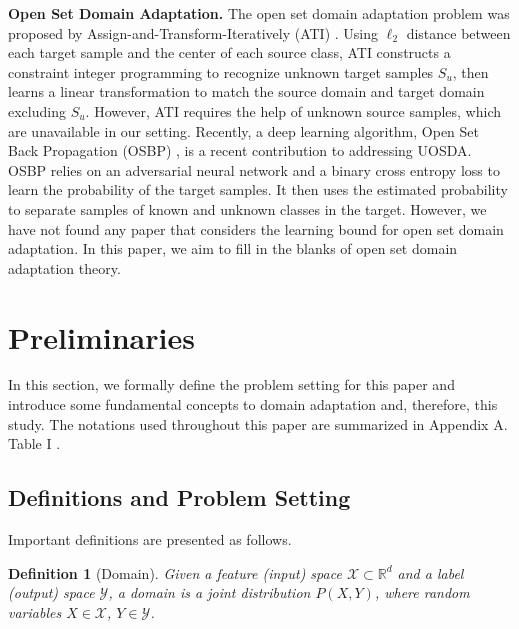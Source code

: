 \documentclass[journal]{IEEEtran}
\newtheorem{Definition}{Definition}
\begin{document}
\textbf{Open Set Domain Adaptation.} The open set domain adaptation problem was proposed by Assign-and-Transform-Iteratively (ATI) \cite{DBLP:conf/iccv/BustoG17}. Using $\ell_2$ distance between each target sample and the center of each source class, ATI constructs a constraint integer programming to recognize unknown target samples $S_u$, then learns a linear transformation to match the source domain and  target domain excluding $S_u$. However, ATI requires the help of unknown source samples, which are unavailable in our setting. Recently, a deep learning algorithm, Open Set Back Propagation (OSBP) \cite{DBLP:conf/eccv/SaitoYUH18}, is a recent contribution to addressing UOSDA. OSBP relies on an adversarial neural network and a binary cross entropy loss to learn the probability of the target samples. It then uses the estimated probability to separate samples of known and unknown classes in the target. However, we have not found any paper that considers the learning bound for open set domain adaptation. In this paper, we aim to fill in the blanks of open set domain adaptation theory.
 \section{ {Preliminaries}}
In this section, we formally define the problem setting for this paper and introduce some fundamental concepts to domain adaptation and, therefore, this study. The notations used throughout this paper are summarized in Appendix A. Table I .

\subsection{Definitions and Problem Setting}

 Important definitions are presented as follows.
\begin{Definition}[{Domain}]\label{d2} Given a feature (input) space $\mathcal{X}\subset \mathbb{R}^d$ and a label (output) space $\mathcal{Y}$, a \textit{domain} is a joint distribution $P(X, Y)$, where random variables $X \in \mathcal{X}$, $Y \in \mathcal{Y}$.
\end{Definition}
\end{document}
